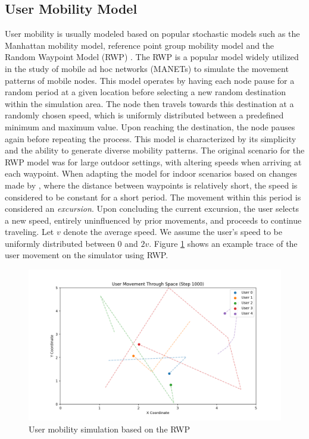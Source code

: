 \subsection{User Mobility Model}
\label{subsec:mod-usr-mob}
User mobility is usually modeled based on popular stochastic models such as the Manhattan mobility model, reference point group mobility model \cite{kahn_experimental_1995} and the Random Waypoint Model (RWP) \cite{imielinski_dynamic_1996}. The RWP is a popular model widely utilized in the study of mobile ad hoc networks (MANETs) to simulate the movement patterns of mobile nodes. This model operates by having each node pause for a random period at a given location before selecting a new random destination within the simulation area. The node then travels towards this destination at a randomly chosen speed, which is uniformly distributed between a predefined minimum and maximum value. Upon reaching the destination, the node pauses again before repeating the process. This model is characterized by its simplicity and the ability to generate diverse mobility patterns. The original scenario for the RWP model was for large outdoor settings, with altering speeds when arriving at each waypoint. When adapting the model for indoor scenarios based on changes made by \cite{wu_smart_2020}, where the distance between waypoints is relatively short, the speed is considered to be constant for a short period. The movement within this period is considered an \textit{excursion}. Upon concluding the current excursion, the user selects a new speed, entirely uninfluenced by prior movements, and proceeds to continue traveling. Let $v$ denote the average speed. We assume the user's speed to be uniformly distributed between $0$ and $2v$. Figure \ref{fig:mod-user-mob} shows an example trace of the user movement on the simulator using RWP.
\begin{figure}
    \centering
    \includegraphics[width=1\linewidth]{Figures/mobility-plot-2025-04-28-15-30-46.png}
    \caption{User mobility simulation based on the RWP}
    \label{fig:mod-user-mob}
\end{figure}
